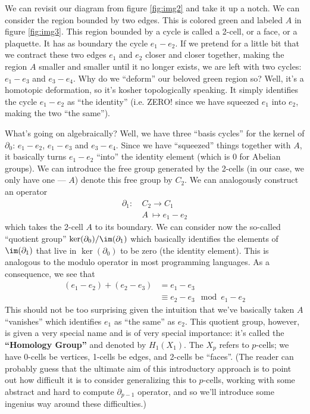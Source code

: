 We can revisit our diagram from figure \ref{fig:img2} and take it
up a notch. We can consider the region bounded by two edges. This
is colored green and labeled $A$ in figure \ref{fig:img3}. This
region bounded by a cycle is called a 2-cell, or a face, or a plaquette.
It has as boundary the cycle $e_{1}-e_{2}$. If we pretend for a
little bit that we contract these two edges $e_{1}$ and $e_{2}$
closer and closer together, making the region $A$ smaller and
smaller until it no longer exists, we are left with two cycles:
$e_{1}-e_{3}$ and $e_{3}-e_{4}$. Why do we ``deform'' our beloved
green region so? Well, it's a homotopic deformation, so it's
kosher topologically speaking. It simply identifies the cycle
$e_{1}-e_{2}$ as ``the identity'' (i.e. ZERO! since we have squeezed
$e_{1}$ into $e_{2}$, making the two ``the same'').

What's going on algebraically? Well, we have three ``basis
cycles'' for the kernel of $\partial_{0}$: $e_{1}-e_{2}$,
$e_{1}-e_{3}$ and $e_{3}-e_{4}$. Since we have ``squeezed''
things together with $A$, it basically turns $e_{1}-e_{2}$
``into'' the identity element (which is 0 for Abelian groups). We
can introduce the free group generated by the 2-cells (in our
case, we only have one --- $A$) denote this free group by
$C_{2}$. We can analogously construct an operator
\begin{equation}%
\begin{split}
\partial_{1}:~&C_{2}\to{C_{1}}\\
              &A~\mapsto{e_{1}-e_{2}}
\end{split}
\end{equation}
which takes the 2-cell $A$ to its boundary. We can consider now
the so-called ``quotient group''
$\ker(\partial_{0})/\im(\partial_{1})$ which basically identifies
the elements of $\im(\partial_{1})$ that live in
$\ker(\partial_{0})$ to be zero (the identity element). This is
analogous to the modulo operator in most programming
languages. As a consequence, we see that
\begin{equation}%
\begin{split}
(e_{1}-e_{2})+(e_{2}-e_{3}) &= e_{1}-e_{3}\\
 &\equiv e_{2}-e_{3} \mod {e_{1}-e_{2}}
\end{split}
\end{equation}
This should not be too surprising given the intuition that we've
basically taken $A$ ``vanishes'' which identifies $e_{1}$ as
``the same'' as $e_{2}$. This quotient group, however, is given a very
special name and is of very special importance: it's called the
\textbf{``Homology Group''} and denoted by $H_{1}(X_{1})$. The
$X_{p}$ refers to $p$-cells; we have 0-cells be vertices, 1-cells
be edges, and 2-cells be ``faces''. (The reader can probably
guess that the ultimate aim of this introductory approach is to
point out how difficult it is to consider generalizing this to
$p$-cells, working with some abstract and hard to compute
$\partial_{p-1}$ operator, and so we'll introduce some ingenius
way around these difficulties.)


